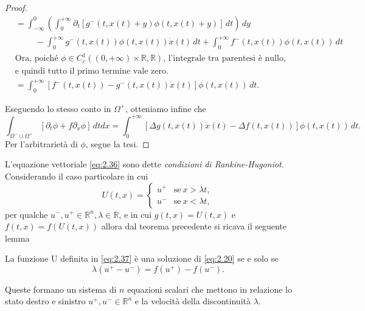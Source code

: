 \begin{proof}
\begin{align*}
        &= \int_{-\infty}^{0}\left(\int_{0}^{+\infty}\partial_{t}[g^{-}(t,x(t)+y)\phi(t,x(t)+y)]\,dt\right)\,dy 
        \\ & \hspace{1cm} -\int_{0}^{+\infty}g^{-}(t,x(t))\phi(t,x(t))\dot{x}(t)\,dt +\int_{0}^{+\infty}f^{-}(t,x(t))\phi(t,x(t))\,dt\\
        &\text{Ora, poiché $\phi\in C^{1}_{c}((0, +\infty)\times\mathbb{R}, \mathbb{R})$, l'integrale tra parentesi è nullo,}\\ &\text{e quindi tutto il primo termine vale zero.}\\
        &=\int_{0}^{+\infty}[f^{-}(t,x(t))-g^{-}(t,x(t))\dot{x}(t)]\phi(t,x(t))\,dt.
    \end{align*}

    \hspace{-0.5cm}Eseguendo lo stesso conto in $\Omega^{+}$, otteniamo infine che 
    \begin{equation*}
        \int_{\Omega^{-}\cup\Omega^{+}}[\partial_{t}\phi+f\partial_{x}\phi]\,dtdx = \int_{0}^{+\infty}[\Delta g(t,x(t))\dot{x}(t)-\Delta f(t,x(t))]\phi(t,x(t))\,dt.
    \end{equation*}
    Per l'arbitrarietà di $\phi$, segue la tesi.
\end{proof}

L'equazione vettoriale \eqref{eq:2.36} sono dette \textit{condizioni di Rankine-Hugoniot}.
Considerando il caso particolare in cui
\begin{equation}\label{eq:2.37}
    U(t,x) = 
    \begin{cases}
        u^{+} & \text{se} \ x>\lambda t, \\
        u^{-} & \text{se} \ x<\lambda t,
    \end{cases}
\end{equation}
per qualche $u^{-}, u^{+}\in\mathbb{R}^{n}, \lambda\in\mathbb{R}$, e in cui $g(t,x)=U(t,x)$ e $f(t,x)=f(U(t,x))$ allora dal teorema precedente si ricava il seguente lemma
\begin{lemma}\label{lemma:2.6.1}
    La funzione U definita in \eqref{eq:2.37} è una soluzione di \eqref{eq:2.20} se e solo se
    \begin{equation}\label{eq:2.38}
        \lambda(u^{+}-u^{-})=f(u^{+})-f(u^{-}).
    \end{equation}
\end{lemma}

Queste formano un sistema di $n$ equazioni scalari che mettono in relazione lo stato destro e sinistro $u^{+}, u^{-}\in\mathbb{R}^{n}$ e la velocità della discontinuità $\lambda$.

